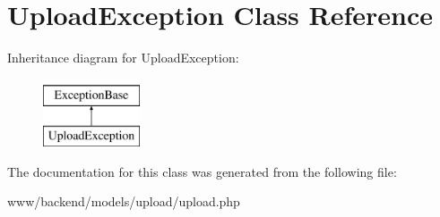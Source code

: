 \hypertarget{classUploadException}{
\section{UploadException Class Reference}
\label{classUploadException}
}
Inheritance diagram for UploadException:\begin{figure}[H]
\begin{center}
\leavevmode
\includegraphics[height=2.000000cm]{classUploadException}
\end{center}
\end{figure}


The documentation for this class was generated from the following file:\begin{DoxyCompactItemize}
\item 
www/backend/models/upload/upload.php\end{DoxyCompactItemize}
